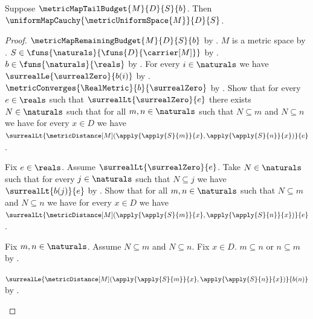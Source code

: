 \begin{theorem}\label{uniform_map_cauchy_from_tail_budget}
    Suppose $\metricMapTailBudget{M}{D}{S}{b}$.
    Then $\uniformMapCauchy{\metricUniformSpace{M}}{D}{S}$.
\end{theorem}
\begin{proof}
    $\metricMapRemainingBudget{M}{D}{S}{b}$
        by .
    $M$ is a metric space
        by .
    $S\in\funs{\naturals}{\funs{D}{\carrier[M]}}$
        by .
    $b\in\funs{\naturals}{\reals}$
        by .
    For every $i\in\naturals$ we have
        $\surrealLe{\surrealZero}{b(i)}$
        by .
    $\metricConverges{\RealMetric}{b}{\surrealZero}$
        by .
    Show that for every $e\in\reals$ such that
        $\surrealLt{\surrealZero}{e}$ there exists $N\in\naturals$
        such that for all $m,n\in\naturals$ such that
            $N\subseteq m$ and $N\subseteq n$ we have
            for every $x\in D$ we have
            $\surrealLt{\metricDistance[M]
                (\apply{\apply{S}{m}}{x},
                 \apply{\apply{S}{n}}{x})}{e}$.
    \begin{subproof}
        Fix $e\in\reals$.
        Assume $\surrealLt{\surrealZero}{e}$.
        Take $N\in\naturals$ such that for every $j\in\naturals$
            such that $N\subseteq j$ we have $\surrealLt{b(j)}{e}$
            by
            .
        Show that for all $m,n\in\naturals$ such that
            $N\subseteq m$ and $N\subseteq n$ we have
            for every $x\in D$ we have
            $\surrealLt{\metricDistance[M]
                (\apply{\apply{S}{m}}{x},
                 \apply{\apply{S}{n}}{x})}{e}$.
        \begin{subproof}
            Fix $m,n\in\naturals$.
            Assume $N\subseteq m$ and $N\subseteq n$.
            Fix $x\in D$.
            $m\subseteq n$ or $n\subseteq m$
                by
                .
            \begin{byCase}
                    $\surrealLe{\metricDistance[M]
                        (\apply{\apply{S}{m}}{x},
                         \apply{\apply{S}{n}}{x})}{b(n)}$
                        by .

\end{byCase}
\end{subproof}
\end{subproof}
\end{proof}
